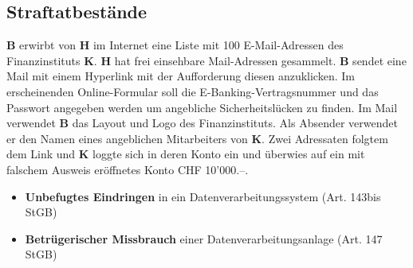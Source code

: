 \subsection{Straftatbestände}
\textbf{B} erwirbt von \textbf{H} im Internet eine Liste mit 100 E-Mail-Adressen des Finanzinstituts \textbf{K}. \textbf{H} hat frei einsehbare Mail-Adressen gesammelt. \textbf{B} sendet eine Mail mit einem Hyperlink mit der Aufforderung diesen anzuklicken. Im erscheinenden Online-Formular soll die E-Banking-Vertragsnummer und das Passwort angegeben werden um angebliche Sicherheitslücken zu finden. Im Mail verwendet \textbf{B} das Layout und Logo des Finanzinstituts. Als Absender verwendet er den Namen eines angeblichen Mitarbeiters von \textbf{K}. Zwei Adressaten folgtem dem Link und \textbf{K} loggte sich in deren Konto ein und überwies auf ein mit falschem Ausweis eröffnetes Konto CHF 10'000.--.
\begin{itemize}
	\item \textbf{Unbefugtes Eindringen} in ein Datenverarbeitungssystem (Art. 143bis StGB)
	\item \textbf{Betrügerischer Missbrauch} einer Datenverarbeitungsanlage (Art. 147 StGB)
\end{itemize}